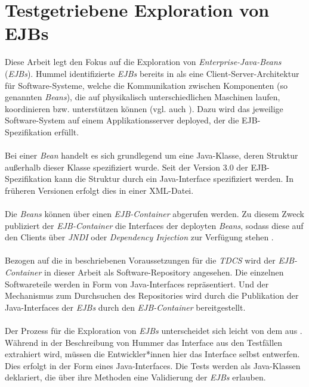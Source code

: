 \section{Testgetriebene Exploration von EJBs}\label{sec_tdcs_ejb}
Diese Arbeit legt den Fokus auf die Exploration von \emph{Enterprise-Java-Beans} (\emph{EJBs}). Hummel identifizierte \emph{EJBs} bereits in \cite{hummel08} als eine Client-Server-Architektur für Software-Systeme, welche die Kommunikation zwischen Komponenten (so genannten \emph{Beans}), die auf physikalisch unterschiedlichen Maschinen laufen, koordinieren bzw. unterstützen können (vgl. auch \cite{ejbspec}). Dazu wird das jeweilige Software-System auf einem Applikationsserver deployed, der die EJB-Spezifikation \cite{ejbspec} erfüllt.
\\\\
Bei einer \emph{Bean} handelt es sich grundlegend um eine Java-Klasse, deren Struktur außerhalb dieser Klasse spezifiziert wurde. Seit der Version 3.0 der EJB-Spezifikation kann die Struktur durch ein Java-Interface spezifiziert werden. In früheren Versionen erfolgt dies in einer XML-Datei. \cite{ejbspec}
\\\\
Die \emph{Beans} können über einen \emph{EJB-Container} abgerufen werden. Zu diesem Zweck publiziert der \emph{EJB-Container} die \Gls{Interface}s der deployten \emph{Beans}, sodass diese auf den Clients über \emph{JNDI} oder \emph{Dependency Injection} zur Verfügung stehen \cite{ejbspec}.
\\\\
Bezogen auf die in \cite{hummel08} beschriebenen Voraussetzungen für die \emph{TDCS} wird der \emph{EJB-Container} in dieser Arbeit als Software-Repository angesehen. Die einzelnen Softwareteile werden in Form von Java-Interfaces repräsentiert. Und der Mechanismus zum Durchsuchen des Repositories wird durch die Publikation der Java-Interfaces der \emph{EJBs} durch den \emph{EJB-Container} bereitgestellt.
\\\\
Der Prozess für die Exploration von \emph{EJBs} unterscheidet sich leicht von dem aus . Während in der Beschreibung von Hummer das \Gls{Interface} aus den Testfällen extrahiert wird, müssen die Entwickler*innen hier das \Gls{Interface} selbst entwerfen. Dies erfolgt in der Form eines Java-Interfaces. Die Tests werden als Java-Klassen deklariert, die über ihre Methoden eine Validierung der \emph{EJBs} erlauben.
\\\\
